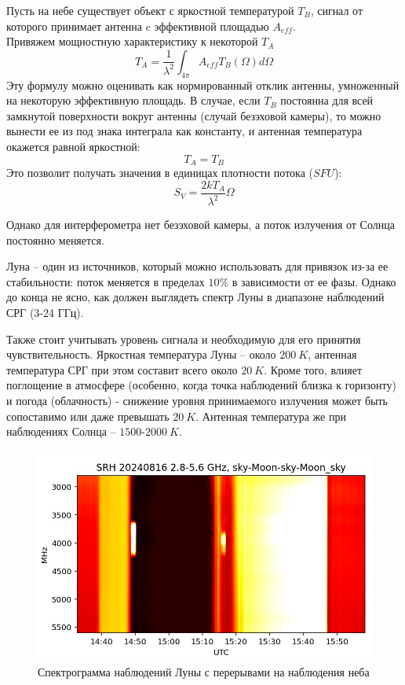 Пусть на небе существует объект с яркостной температурой $T_B$, сигнал от которого принимает антенна c эффективной площадью $A_{eff}$.\\
Привяжем мощностную характеристику к некоторой $T_A$
\begin{equation}\label{eq:антенная температура}
	T_A = \dfrac{1}{\lambda^2} \int_{4 \pi}^{} A_{eff} T_B (\Omega) d\Omega
\end{equation}
Эту формулу можно оценивать как нормированный отклик антенны, умноженный на некоторую эффективную площадь. В случае, если $T_B$ постоянна для всей замкнутой поверхности вокруг антенны (случай безэховой камеры), то можно вынести ее из под знака интеграла как константу, и антенная температура окажется равной яркостной:
\begin{equation}\label{eq:равность температур}
	T_A = T_B
\end{equation}
Это позволит получать значения в единицах плотности потока ($SFU$):
\begin{equation}\label{eq:перевод в плотность потока}
	S_V = \dfrac{2kT_A}{\lambda^2} \Omega
\end{equation}

Однако для интерферометра нет безэховой камеры, а поток излучения от Солнца постоянно меняется.

Луна -- один из источников, который можно использовать для привязок из-за ее стабильности: поток меняется в пределах $10\%$ в зависимости от ее фазы. Однако до конца не ясно, как должен выглядеть спектр Луны в диапазоне наблюдений СРГ (3-24 ГГц).

Также стоит учитывать уровень сигнала и необходимую для его принятия чувствительность. Яркостная температура Луны -- около $200~K$, антенная температура СРГ при этом составит всего около $20~K$. Кроме того, влияет поглощение в атмосфере (особенно, когда точка наблюдений близка к горизонту) и погода (облачность) - снижение уровня принимаемого излучения может быть сопоставимо или даже превышать $20~K$. Антенная температура же при наблюдениях Солнца -- $1500$-$2000~K$.

\begin{figure}[H]
	\centering
	\includegraphics[width=0.7\linewidth]{images/moon_spectre}
	\caption{Спектрограмма наблюдений Луны с перерывами на наблюдения неба}
	\label{fig:moon_spectre}
\end{figure}

